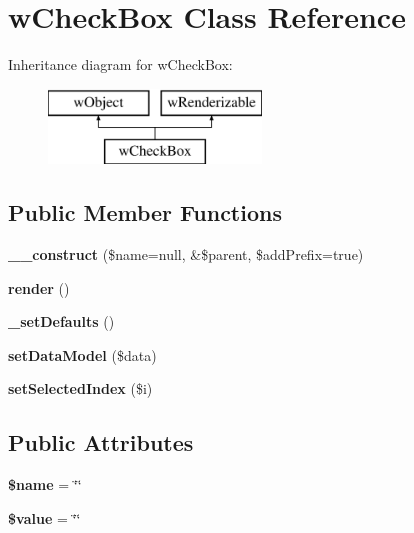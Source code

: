 \hypertarget{classwCheckBox}{
\section{wCheckBox Class Reference}
\label{classwCheckBox}
}
Inheritance diagram for wCheckBox:\begin{figure}[H]
\begin{center}
\leavevmode
\includegraphics[height=2.000000cm]{classwCheckBox}
\end{center}
\end{figure}
\subsection*{Public Member Functions}
\begin{DoxyCompactItemize}
\item 
\hypertarget{classwCheckBox_abe2e9ab5d730fc2cde13c618ad7ef8dd}{
{\bfseries \_\-\_\-construct} (\$name=null, \&\$parent, \$addPrefix=true)}
\label{classwCheckBox_abe2e9ab5d730fc2cde13c618ad7ef8dd}

\item 
\hypertarget{classwCheckBox_a0fd9ab2d9eee80f87fd17c15fb85ff54}{
{\bfseries render} ()}
\label{classwCheckBox_a0fd9ab2d9eee80f87fd17c15fb85ff54}

\item 
\hypertarget{classwCheckBox_acb4ad73eddd9b47317a96c30b604d469}{
{\bfseries \_\-setDefaults} ()}
\label{classwCheckBox_acb4ad73eddd9b47317a96c30b604d469}

\item 
\hypertarget{classwCheckBox_a903a74c0dfe2b815f5130c2d494b3a0b}{
{\bfseries setDataModel} (\$data)}
\label{classwCheckBox_a903a74c0dfe2b815f5130c2d494b3a0b}

\item 
\hypertarget{classwCheckBox_a4a69292303dfba7a8728019c11e33335}{
{\bfseries setSelectedIndex} (\$i)}
\label{classwCheckBox_a4a69292303dfba7a8728019c11e33335}

\end{DoxyCompactItemize}
\subsection*{Public Attributes}
\begin{DoxyCompactItemize}
\item 
\hypertarget{classwCheckBox_a9c07fe7a31f2502adcb4ae93e80c3f7f}{
{\bfseries \$name} = \char`\"{}\char`\"{}}
\label{classwCheckBox_a9c07fe7a31f2502adcb4ae93e80c3f7f}

\item 
\hypertarget{classwCheckBox_a58137333c3f18572be96d11b2ec5e13e}{
{\bfseries \$value} = \char`\"{}\char`\"{}}
\label{classwCheckBox_a58137333c3f18572be96d11b2ec5e13e}

\end{DoxyCompactItemize}


